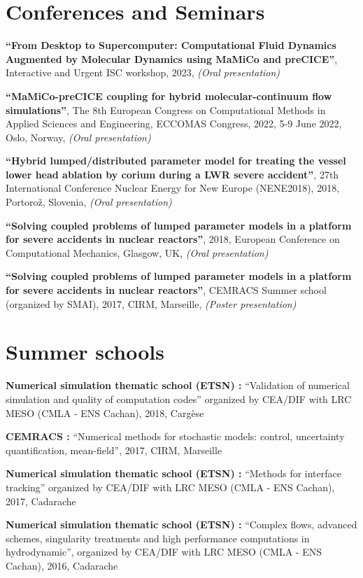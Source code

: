 \documentclass{article}
\renewenvironment{itemize}{
  \begin{list}{}{
      \setlength{\leftmargin}{1.5em}
      \setlength{\itemsep}{0.25em}
      \setlength{\parskip}{0pt}
      \setlength{\parsep}{0.25em}
    }
}{
  \end{list}
}
\begin{document}
\section*{Conferences and Seminars}
\begin{itemize}
	\item \textbf{``From Desktop to Supercomputer: Computational Fluid Dynamics Augmented by Molecular Dynamics using MaMiCo and preCICE''}, Interactive and Urgent ISC workshop, 2023, \textit{(Oral presentation)}
	\item \textbf{``MaMiCo-preCICE coupling for hybrid molecular-continuum flow simulations''}, The 8th European Congress on Computational Methods in Applied Sciences and Engineering, ECCOMAS Congress, 2022, 5-9 June 2022, Oslo, Norway, \textit{(Oral presentation)}
	\item \textbf{``Hybrid lumped/distributed parameter model for treating the vessel lower head ablation by corium during a LWR severe accident''}, 27th International Conference Nuclear Energy for New Europe (NENE2018), 2018, Portorož, Slovenia, \textit{(Oral presentation)}
	\item \textbf{``Solving coupled problems of lumped parameter models in a platform for severe accidents in nuclear reactors''}, 2018, European Conference on Computational Mechanics, Glasgow, UK, \textit{(Oral presentation)}
	\item \textbf{``Solving coupled problems of lumped parameter models in a platform for severe accidents in nuclear reactors''}, CEMRACS Summer school (organized by SMAI), 2017, CIRM, Marseille, \textit{(Poster presentation)}
\end{itemize}  

\section*{Summer schools}
\begin{itemize}
	\item \textbf{Numerical simulation thematic school (ETSN) :} ``Validation of numerical simulation and quality of computation codes'' organized by CEA/DIF with LRC MESO (CMLA - ENS Cachan), 2018, Cargèse
	\item \textbf{CEMRACS :} ``Numerical methods for stochastic models: control, uncertainty quantification, mean-field'', 2017, CIRM, Marseille
	\item \textbf{Numerical simulation thematic school (ETSN) :} ``Methods for interface tracking'' organized by CEA/DIF with LRC MESO (CMLA - ENS Cachan), 2017, Cadarache
	\item \textbf{Numerical simulation thematic school (ETSN) :} ``Complex flows, advanced schemes, singularity treatments and high performance computations in hydrodynamic'', organized by CEA/DIF with LRC MESO (CMLA - ENS Cachan), 2016, Cadarache
\end{itemize}
\end{document}
